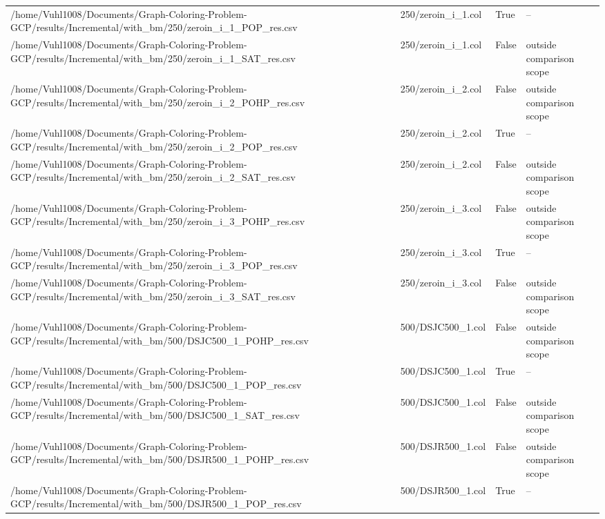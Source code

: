 \begin{table}[htbp]
\begin{tabular}{llll}
/home/Vuhl1008/Documents/Graph-Coloring-Problem-GCP/results/Incremental/with\_bm/250/zeroin\_i\_1\_POP\_res.csv & 250/zeroin\_i\_1.col & True & -- \\
/home/Vuhl1008/Documents/Graph-Coloring-Problem-GCP/results/Incremental/with\_bm/250/zeroin\_i\_1\_SAT\_res.csv & 250/zeroin\_i\_1.col & False & outside comparison scope \\
/home/Vuhl1008/Documents/Graph-Coloring-Problem-GCP/results/Incremental/with\_bm/250/zeroin\_i\_2\_POHP\_res.csv & 250/zeroin\_i\_2.col & False & outside comparison scope \\
/home/Vuhl1008/Documents/Graph-Coloring-Problem-GCP/results/Incremental/with\_bm/250/zeroin\_i\_2\_POP\_res.csv & 250/zeroin\_i\_2.col & True & -- \\
/home/Vuhl1008/Documents/Graph-Coloring-Problem-GCP/results/Incremental/with\_bm/250/zeroin\_i\_2\_SAT\_res.csv & 250/zeroin\_i\_2.col & False & outside comparison scope \\
/home/Vuhl1008/Documents/Graph-Coloring-Problem-GCP/results/Incremental/with\_bm/250/zeroin\_i\_3\_POHP\_res.csv & 250/zeroin\_i\_3.col & False & outside comparison scope \\
/home/Vuhl1008/Documents/Graph-Coloring-Problem-GCP/results/Incremental/with\_bm/250/zeroin\_i\_3\_POP\_res.csv & 250/zeroin\_i\_3.col & True & -- \\
/home/Vuhl1008/Documents/Graph-Coloring-Problem-GCP/results/Incremental/with\_bm/250/zeroin\_i\_3\_SAT\_res.csv & 250/zeroin\_i\_3.col & False & outside comparison scope \\
/home/Vuhl1008/Documents/Graph-Coloring-Problem-GCP/results/Incremental/with\_bm/500/DSJC500\_1\_POHP\_res.csv & 500/DSJC500\_1.col & False & outside comparison scope \\
/home/Vuhl1008/Documents/Graph-Coloring-Problem-GCP/results/Incremental/with\_bm/500/DSJC500\_1\_POP\_res.csv & 500/DSJC500\_1.col & True & -- \\
/home/Vuhl1008/Documents/Graph-Coloring-Problem-GCP/results/Incremental/with\_bm/500/DSJC500\_1\_SAT\_res.csv & 500/DSJC500\_1.col & False & outside comparison scope \\
/home/Vuhl1008/Documents/Graph-Coloring-Problem-GCP/results/Incremental/with\_bm/500/DSJR500\_1\_POHP\_res.csv & 500/DSJR500\_1.col & False & outside comparison scope \\
/home/Vuhl1008/Documents/Graph-Coloring-Problem-GCP/results/Incremental/with\_bm/500/DSJR500\_1\_POP\_res.csv & 500/DSJR500\_1.col & True & -- \\

\end{tabular}
\end{table}
